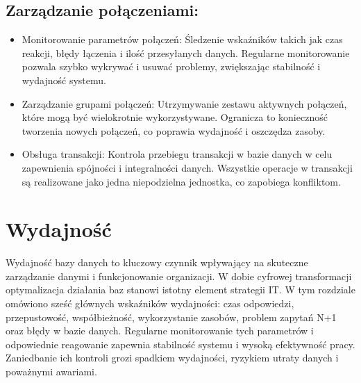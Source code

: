\documentclass[a4paper,11pt,openany,english]{sphinxmanual}
\begin{document}
\subsection{Zarządzanie połączeniami:}
\label{\detokenize{rozdzial2/index:zarzadzanie-polaczeniami}}\begin{itemize}
\item {} 
\sphinxAtStartPar
Monitorowanie parametrów połączeń: Śledzenie wskaźników takich jak czas reakcji, błędy łączenia i ilość przesyłanych danych. Regularne monitorowanie pozwala szybko wykrywać i usuwać problemy, zwiększając stabilność i wydajność systemu.

\item {} 
\sphinxAtStartPar
Zarządzanie grupami połączeń: Utrzymywanie zestawu aktywnych połączeń, które mogą być wielokrotnie wykorzystywane. Ogranicza to konieczność tworzenia nowych połączeń, co poprawia wydajność i oszczędza zasoby.

\item {} 
\sphinxAtStartPar
Obsługa transakcji: Kontrola przebiegu transakcji w bazie danych w celu zapewnienia spójności i integralności danych. Wszystkie operacje w transakcji są realizowane jako jedna niepodzielna jednostka, co zapobiega konfliktom.

\end{itemize}


\section{Wydajność}
\label{\detokenize{rozdzial2/index:wydajnosc}}
\sphinxAtStartPar
Wydajność bazy danych to kluczowy czynnik wpływający na skuteczne zarządzanie danymi i funkcjonowanie organizacji. W dobie cyfrowej transformacji optymalizacja działania baz stanowi istotny element strategii IT. W tym rozdziale omówiono sześć głównych wskaźników wydajności: czas odpowiedzi, przepustowość, współbieżność, wykorzystanie zasobów, problem zapytań N+1 oraz błędy w bazie danych. Regularne monitorowanie tych parametrów i odpowiednie reagowanie zapewnia stabilność systemu i wysoką efektywność pracy. Zaniedbanie ich kontroli grozi spadkiem wydajności, ryzykiem utraty danych i poważnymi awariami.
\end{document}
